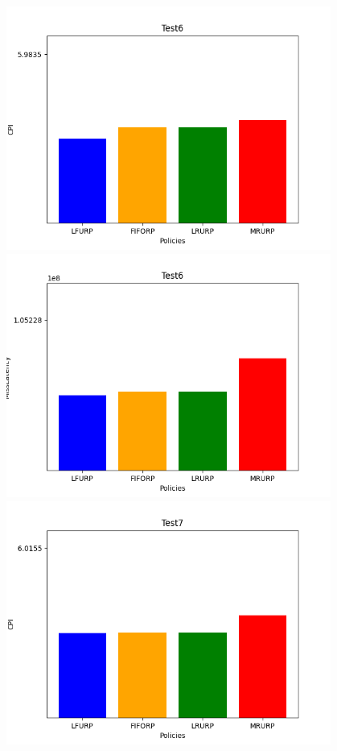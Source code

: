 ‫\includegraphics[width=0.8\textwidth]{graph/csv6CPI.png}\\
‫\includegraphics[width=0.8\textwidth]{graph/csv6Miss.png}\\
‫\includegraphics[width=0.8\textwidth]{graph/csv7CPI.png}\\
